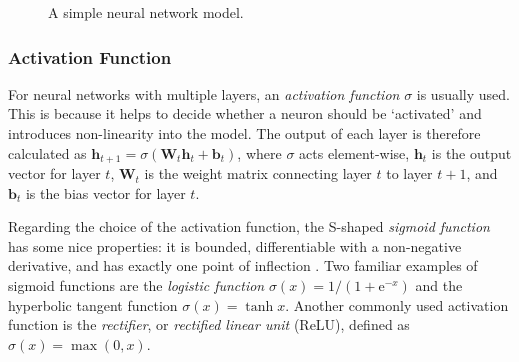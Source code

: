 \documentclass[a4paper,11pt,titlepage]{article}
\theoremstyle{definition}
\theoremstyle{plain}
\theoremstyle{remark}
\begin{document}
\begin{figure}[htbp]
    \centering
    \caption{A simple neural network model.}
    \label{fig:nn}
\end{figure}

\subsubsection{Activation Function}

For neural networks with multiple layers, an \textit{activation function} $\sigma$ is usually used. This is because it helps to decide whether a neuron should be ‘activated’ and introduces non-linearity into the model. The output of each layer is therefore calculated as $\mathbf{h}_{t+1}=\sigma\left(\mathbf{W}_t\mathbf{h}_t+\mathbf{b}_t\right)$, where $\sigma$ acts element-wise, $\mathbf{h}_t$ is the output vector for layer $t$, $\mathbf{W}_t$ is the weight matrix connecting layer $t$ to layer $t+1$, and $\mathbf{b}_t$ is the bias vector for layer $t$. 

Regarding the choice of the activation function, the S-shaped \textit{sigmoid function} has some nice properties: it is bounded, differentiable with a non-negative derivative, and has exactly one point of inflection \cite{HanMoraga}. Two familiar examples of sigmoid functions are the \textit{logistic function} $\sigma(x)=1/\left(1+\mathrm{e}^{-x}\right)$ and the hyperbolic tangent function $\sigma(x)=\tanh x$. Another commonly used activation function is the \textit{rectifier}, or \textit{rectified linear unit} (ReLU), defined as $\sigma(x)=\max(0, x)$.
\end{document}
